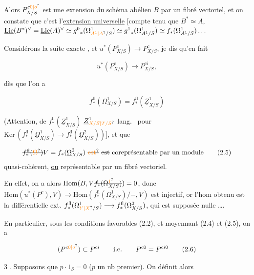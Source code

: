 Alors $P^{c\unsure{0|o}}_{X/S}$  est une extension du schéma abélien $B$ par un fibré vectoriel, et on constate que c'est l'\uline{extension universelle} [compte tenu que $B^*\simeq A$,  $\underline{\mathrm{Lie}}(B^*)^\vee=\underline{\mathrm{Lie}}(A)^\vee\simeq {g^0}_*(\Omega^1_{\unsure{A^1|A}/S})\simeq {g^1}_*(\Omega^1_{A^1/S})\simeq f_*(\Omega^1_{A^1/S})\ldots$


Considérons la suite exacte , et $u^*(P^c_{X/S})\to P^c_{X/S}$, je dis qu'en fait

\[
u^*(P^c_{X/S})\longrightarrow P^{ci}_{X/S},\tag*{(2.3)}
\]

 dès que l'on a

\[
f_*^{\mathrm{fl}}(\Omega^1_{X/S})=f_*^{\mathrm{fl}}(\underline Z^1_{X/S})\tag*{(2.4)}
\]


(Attention,   de $f_*^{\mathrm{fl}}(\underline Z^1_{X/S})$   $\underline Z^1_{\unsure{X/S|T/S}}$ lang.\  pour $\mathrm{Ker}\,(f_*^{\mathrm{fl}}(\underline\Omega^1_{X/S})\longrightarrow f_*^{\mathrm{fl}}(\underline\Omega^2_{X/S}))$], et que


\[
\deleted{f_*^{\mathrm{fl}}(\unsure{\Omega})} V=f_*(\underline\Omega^2_{X/S})\ \deleted{\unsure{\text{est}}}\ \deleted{\text{est}}\ \text{coreprésentable par un module}\tag*{(2.5)}
\]
quasi-cohérent, \uline{ou} représentable par un fibré vectoriel.

En effet, on a alors $\mathrm{Hom}(B,V\deleted{f_*(\Omega^{\unsure{1}}_{X/S})})=0$, donc $\mathrm{Hom}(u^*(P^c),V)\longrightarrow\mathrm{Hom}(f_*^{\mathrm{fl}}(\Omega^1_{X/S})/{-},V)$ est injectif,  or l'hom obtenu est la différentielle ext. $f_*^{\mathrm{fl}}(\Omega^1_{\unsure{Y|X}/S})\longrightarrow f_*^{\mathrm{fl}}(\Omega^2_{X/S})$, qui est supposée nulle \ldots.

En particulier, sous les conditions favorables (2.2), et moyennant (2.4) et (2.5), on a

\[
(P^{c\unsure{0|o}})\subset P^{ci}\qquad\text{i.e.}\qquad P^{c0}=P^{ci0}\tag*{(2.6)}
\]

\textcircled{3}. Supposons que $p\cdot1_S=0$ ($p$ un nb premier). On définit alors


